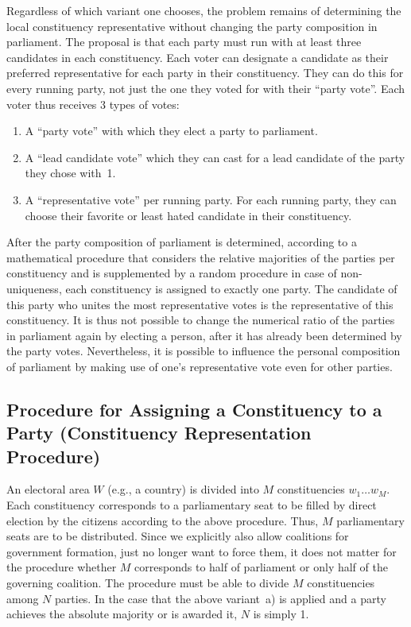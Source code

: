 Regardless of which variant one chooses, the problem remains of determining the local
constituency representative without changing the party composition in parliament. The
proposal is that each party must run with at least three candidates in each constituency.
Each voter can designate a candidate as their preferred representative for each party in their constituency.
They can do this for every running party, not just the one they
voted for with their \enquote{party vote}. Each voter thus receives 3 types of
votes:
\begin{enumerate}
  \item A \enquote{party vote} with which they elect a party to parliament.
  \item A \enquote{lead candidate vote} which they can cast for a lead candidate of the party they chose with~1.
  \item A \enquote{representative vote} per running party. For each running party, they can
    choose their favorite or least hated candidate in their constituency.
\end{enumerate}
After the party composition of parliament is determined, according to a mathematical
procedure that considers the relative majorities of the parties per constituency and is
supplemented by a random procedure in case of non-uniqueness, each constituency is assigned to exactly one party.
The candidate of this party who unites the most representative votes is
the representative of this constituency. It is thus not possible to change the
numerical ratio of the parties in parliament again by electing a person, after it has already been determined by the
party votes. Nevertheless, it is possible to influence the personal composition
of parliament by making use of one's representative vote even for other parties.

\subsection{Procedure for Assigning a Constituency to a Party (Constituency Representation Procedure)}

An electoral area $W$ (e.g., a country) is divided into $M$ constituencies $w_1 \ldots w_M$. Each
constituency corresponds to a parliamentary seat to be filled by direct election by the citizens according to the above procedure.
Thus, $M$ parliamentary seats are to be distributed. Since we explicitly also
allow coalitions for government formation, just no longer want to force them, it does not matter for the
procedure whether $M$ corresponds to half of parliament or only half of the governing coalition.
The procedure must be able to divide $M$ constituencies among $N$ parties. In the case that
the above variant~a) is applied and a party achieves the absolute majority or is
awarded it, $N$ is simply 1.

